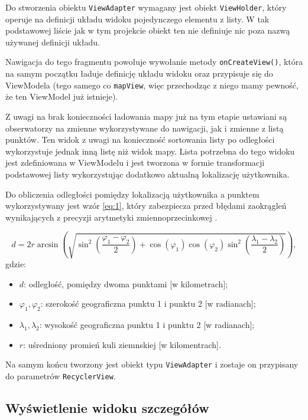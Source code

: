 \documentclass[polish,polish,a4paper,12pt]{article}
\begin{document}
	Do stworzenia obiektu \texttt{ViewAdapter} wymagany jest obiekt \texttt{ViewHolder}, który operuje na definicji układu widoku pojedynczego elementu z listy. W tak podstawowej liście jak w tym projekcie obiekt ten nie definiuje nic poza nazwą używanej definicji układu.

	Nawigacja do tego fragmentu powołuje wywołanie metody \texttt{onCreateView()}, która na samym początku ładuje definicję układu widoku oraz przypisuje się do ViewModela (tego samego co \texttt{mapView}, więc przechodząc z niego mamy pewność, że ten ViewModel już istnieje).

	Z uwagi na brak konieczności ładowania mapy już na tym etapie ustawiani są obserwatorzy na zmienne wykorzystywane do nawigacji, jak i zmienne z listą punktów. Ten widok z uwagi na konieczność sortowania listy po odległości wykorzystuje jednak inną listę niż widok mapy. Lista potrzebna do tego widoku jest zdefiniowana w ViewModelu i jest tworzona w formie transformacji podstawowej listy wykorzystując dodatkowo aktualną lokalizację użytkownika.

	Do obliczenia odległości pomiędzy lokalizacją użytkownika a punktem wykorzystywany jest wzór \ref{eq:1}, który zabezpiecza przed błędami zaokrągleń wynikających z precyzji arytmetyki zmiennoprzecinkowej \cite{haversineformulawiki}.

	\begin{equation}
d = 2r\arcsin(\sqrt{\sin^2(\frac{\varphi_1-\varphi_2}{2})+\cos(\varphi_1)\cos(\varphi_2)\sin^2(\frac{\lambda_1-\lambda_2}{2})}),\label{eq:1}
	\end{equation}
	gdzie:
	\begin{itemize}
		\item $ d $: odległość, pomiędzy dwoma punktami [w kilometrach];
		\item $ \varphi_1, \varphi_2 $: szerokość geograficzna punktu 1 i punktu 2 [w radianach];
		\item $ \lambda_1, \lambda_2 $: wysokość geograficzna punktu 1 i punktu 2 [w radianach];
		\item $ r $: uśredniony promień kuli ziemnskiej [w kilomentrach].
	\end{itemize}

	Na samym końcu tworzony jest obiekt typu \texttt{ViewAdapter} i zostaje on przypisany do parametrów \texttt{RecyclerView}.

	\subsection{Wyświetlenie widoku szczegółów}
\end{document}

